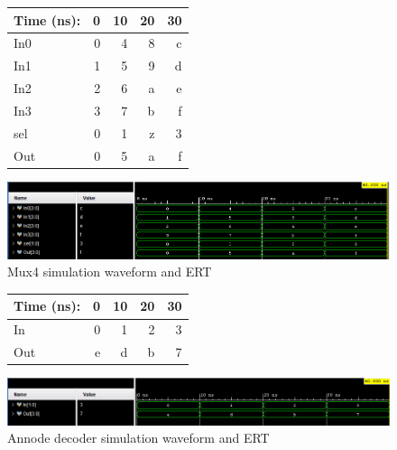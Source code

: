 \documentclass[11pt]{article}
\begin{document}
\begin{figure}[ht]\centering
	\begin{tabular}{l|rrrr}
		Time (ns): & 0 & 10 & 20 & 30  \\
		\midrule 
		In0 & 0 & 4 & 8 & c \\
		In1 & 1 & 5 & 9 & d  \\
		In2 & 2 & 6 & a & e  \\
		In3 & 3 & 7 & b & f  \\
		sel & 0 & 1 & z & 3  \\
		\bottomrule
		Out & 0 & 5 & a & f  \\
	\end{tabular}\medskip
	
	\includegraphics[width=1.0\textwidth]{Mux4_Test}
	\caption{Mux4 simulation waveform and ERT}
	\label{fig:sim_with_table}
\end{figure}

\begin{figure}[ht]\centering
	\begin{tabular}{l|rrrr}
		Time (ns): & 0 & 10 & 20 & 30 \\
		\midrule 
		In & 0 & 1 & 2 & 3  \\
		\bottomrule
		Out & e & d & b & 7 \\
	\end{tabular}\medskip
	
	\includegraphics[width=1.0\textwidth]{annode_decoder_test}
	\caption{Annode decoder simulation waveform and ERT}
	\label{fig:sim_with_table}
\end{figure}
\end{document}
